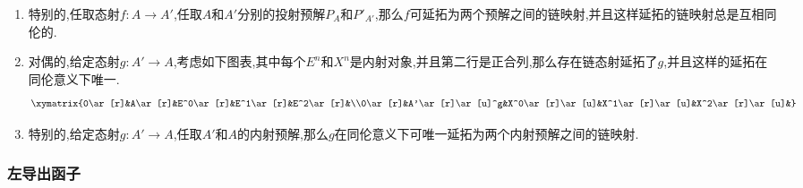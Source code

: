 \begin{enumerate}
\begin{proof}
		现在考虑如下图表,其中$d_{n+2}'$是$P_{n+2}'\to\mathrm{im}d_{n+2}'$的满态射,于是$h_{n+1}-f_{n+1}-s_nd_{n+1}:P_{n+1}\to\mathrm{im}d_{n+2}'$可提升为态射$s_{n+1}:P_{n+1}\to P_{n+2}'$,这就构造$s_{n+1}$满足了$h_{n+1}-f_{n+1}=s_nd_{n+1}+d_{n+2}'s_{n+1}$.
	\end{proof}
	\item 特别的,任取态射$f:A\to A'$,任取$A$和$A'$分别的投射预解$P_A$和$P'_{A'}$,那么$f$可延拓为两个预解之间的链映射,并且这样延拓的链映射总是互相同伦的.
	\item 对偶的,给定态射$g:A'\to A$,考虑如下图表,其中每个$E^n$和$X^n$是内射对象,并且第二行是正合列,那么存在链态射延拓了$g$,并且这样的延拓在同伦意义下唯一.
	$$\xymatrix{0\ar[r]&A\ar[r]&E^0\ar[r]&E^1\ar[r]&E^2\ar[r]&\\0\ar[r]&A'\ar[r]\ar[u]^g&X^0\ar[r]\ar[u]&X^1\ar[r]\ar[u]&X^2\ar[r]\ar[u]&}$$
	\item 特别的,给定态射$g:A'\to A$,任取$A'$和$A$的内射预解,那么$g$在同伦意义下可唯一延拓为两个内射预解之间的链映射.
\end{enumerate}
\subsubsection{左导出函子}

